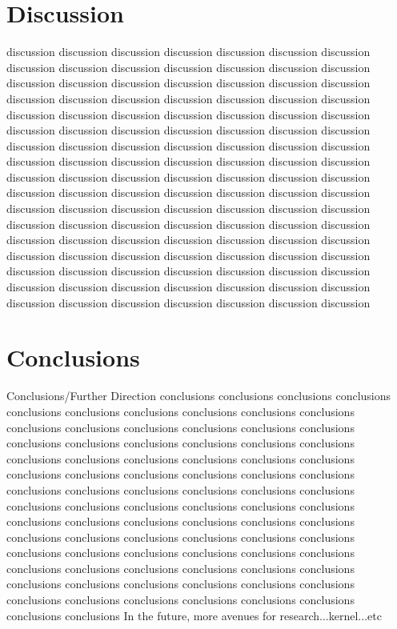 \documentclass[letterpaper, 11pt]{article}
\begin{document}
\section{Discussion}
discussion discussion discussion discussion discussion discussion discussion
discussion discussion discussion discussion discussion discussion discussion
discussion discussion discussion discussion discussion discussion discussion
discussion discussion discussion discussion discussion discussion discussion
discussion discussion discussion discussion discussion discussion discussion
discussion discussion discussion discussion discussion discussion discussion
discussion discussion discussion discussion discussion discussion discussion
discussion discussion discussion discussion discussion discussion discussion
discussion discussion discussion discussion discussion discussion discussion
discussion discussion discussion discussion discussion discussion discussion
discussion discussion discussion discussion discussion discussion discussion
discussion discussion discussion discussion discussion discussion discussion
discussion discussion discussion discussion discussion discussion discussion
discussion discussion discussion discussion discussion discussion discussion
discussion discussion discussion discussion discussion discussion discussion
discussion discussion discussion discussion discussion discussion discussion
discussion discussion discussion discussion discussion discussion discussion


\section{Conclusions}
Conclusions/Further Direction
conclusions conclusions conclusions conclusions conclusions conclusions conclusions 
conclusions conclusions conclusions conclusions conclusions conclusions conclusions 
conclusions conclusions conclusions conclusions conclusions conclusions conclusions 
conclusions conclusions conclusions conclusions conclusions conclusions conclusions 
conclusions conclusions conclusions conclusions conclusions conclusions conclusions 
conclusions conclusions conclusions conclusions conclusions conclusions conclusions 
conclusions conclusions conclusions conclusions conclusions conclusions conclusions 
conclusions conclusions conclusions conclusions conclusions conclusions conclusions 
conclusions conclusions conclusions conclusions conclusions conclusions conclusions 
conclusions conclusions conclusions conclusions conclusions conclusions conclusions 
conclusions conclusions conclusions conclusions conclusions conclusions conclusions 
conclusions conclusions conclusions conclusions conclusions conclusions conclusions 
In the future, more avenues for research...kernel...etc




\end{document}
